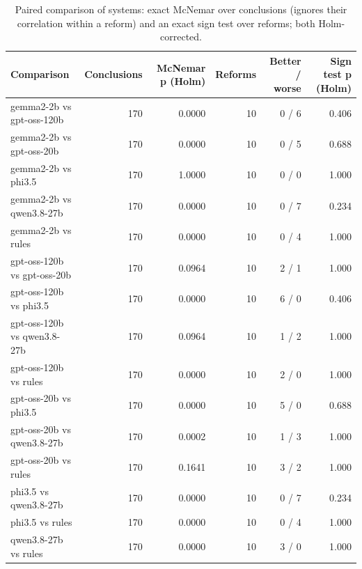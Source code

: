 \begin{table}[t]
\centering\small
\caption{Paired comparison of systems: exact McNemar over conclusions (ignores their correlation within a reform) and an exact sign test over reforms; both Holm-corrected.}
\label{tab:mcnemar}
\begin{tabular}{lrrrrr}
\toprule
Comparison & Conclusions & McNemar p (Holm) & Reforms & Better / worse & Sign test p (Holm) \\
\midrule
gemma2-2b vs gpt-oss-120b & 170 & 0.0000 & 10 & 0 / 6 & 0.406 \\
gemma2-2b vs gpt-oss-20b & 170 & 0.0000 & 10 & 0 / 5 & 0.688 \\
gemma2-2b vs phi3.5 & 170 & 1.0000 & 10 & 0 / 0 & 1.000 \\
gemma2-2b vs qwen3.8-27b & 170 & 0.0000 & 10 & 0 / 7 & 0.234 \\
gemma2-2b vs rules & 170 & 0.0000 & 10 & 0 / 4 & 1.000 \\
gpt-oss-120b vs gpt-oss-20b & 170 & 0.0964 & 10 & 2 / 1 & 1.000 \\
gpt-oss-120b vs phi3.5 & 170 & 0.0000 & 10 & 6 / 0 & 0.406 \\
gpt-oss-120b vs qwen3.8-27b & 170 & 0.0964 & 10 & 1 / 2 & 1.000 \\
gpt-oss-120b vs rules & 170 & 0.0000 & 10 & 2 / 0 & 1.000 \\
gpt-oss-20b vs phi3.5 & 170 & 0.0000 & 10 & 5 / 0 & 0.688 \\
gpt-oss-20b vs qwen3.8-27b & 170 & 0.0002 & 10 & 1 / 3 & 1.000 \\
gpt-oss-20b vs rules & 170 & 0.1641 & 10 & 3 / 2 & 1.000 \\
phi3.5 vs qwen3.8-27b & 170 & 0.0000 & 10 & 0 / 7 & 0.234 \\
phi3.5 vs rules & 170 & 0.0000 & 10 & 0 / 4 & 1.000 \\
qwen3.8-27b vs rules & 170 & 0.0000 & 10 & 3 / 0 & 1.000 \\
\bottomrule
\end{tabular}
\end{table}
